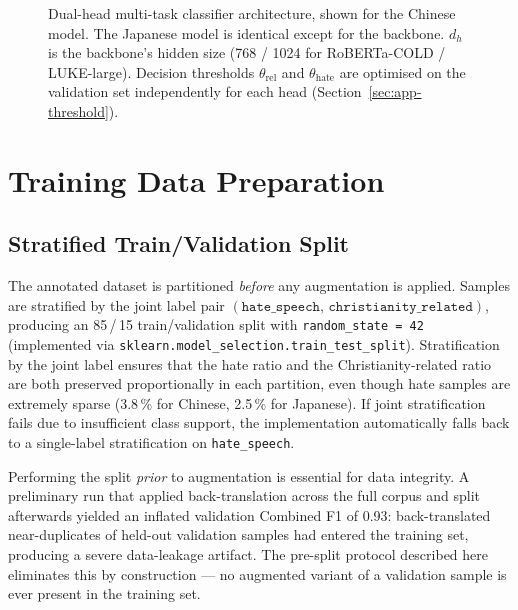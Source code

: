 \documentclass[../CLthesis.tex]{subfiles}
\begin{document}
\begin{figure}[htbp]
\caption{Dual-head multi-task classifier architecture, shown for the Chinese model. The Japanese model is identical except for the backbone. $d_h$ is the backbone's hidden size (768 / 1024 for RoBERTa-COLD / LUKE-large). Decision thresholds $\theta_\mathrm{rel}$ and $\theta_\mathrm{hate}$ are optimised on the validation set independently for each head (Section~\ref{sec:app-threshold}).}
\label{fig:classifier-arch}
\end{figure}


\section{Training Data Preparation}
\label{sec:app-data}

\subsection{Stratified Train/Validation Split}
\label{subsec:app-split}

The annotated dataset is partitioned \emph{before} any augmentation is applied. Samples are stratified by the joint label pair $(\texttt{hate\_speech},\,\texttt{christianity\_related})$, producing an 85\,/\,15 train/validation split with \texttt{random\_state\,=\,42} (implemented via \texttt{sklearn.model\_selection.train\_test\_split}). Stratification by the joint label ensures that the hate ratio and the Christianity-related ratio are both preserved proportionally in each partition, even though hate samples are extremely sparse (3.8\,\% for Chinese, 2.5\,\% for Japanese). If joint stratification fails due to insufficient class support, the implementation automatically falls back to a single-label stratification on \texttt{hate\_speech}.

Performing the split \emph{prior} to augmentation is essential for data integrity. A preliminary run that applied back-translation across the full corpus and split afterwards yielded an inflated validation Combined F1 of 0.93: back-translated near-duplicates of held-out validation samples had entered the training set, producing a severe data-leakage artifact. The pre-split protocol described here eliminates this by construction --- no augmented variant of a validation sample is ever present in the training set.
\end{document}
